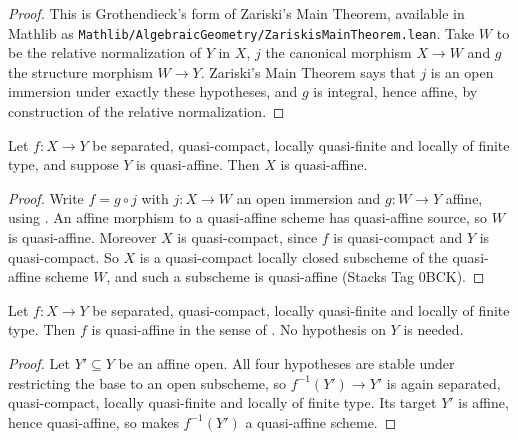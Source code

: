 \begin{proof}
  \leanok
  This is Grothendieck's form of Zariski's Main Theorem, available in Mathlib
  as \texttt{Mathlib/AlgebraicGeometry/ZariskisMainTheorem.lean}.  Take $W$ to
  be the relative normalization of $Y$ in $X$, $j$ the canonical morphism
  $X\to W$ and $g$ the structure morphism $W\to Y$.  Zariski's Main Theorem
  says that $j$ is an open immersion under exactly these hypotheses, and $g$ is
  integral, hence affine, by construction of the relative normalization.
\end{proof}

\begin{lemma}
  \label{lemma:nagata-zmt-quasi-affine-source}
  \leanok

  Let $f\colon X\to Y$ be separated, quasi-compact, locally quasi-finite and
  locally of finite type, and suppose $Y$ is quasi-affine.  Then $X$ is
  quasi-affine.
\end{lemma}

\begin{proof}
  \leanok
  Write $f=g\circ j$ with $j\colon X\to W$ an open immersion and $g\colon W\to
  Y$ affine, using
  .  An affine
  morphism to a quasi-affine scheme has quasi-affine source, so $W$ is
  quasi-affine.  Moreover $X$ is quasi-compact, since $f$ is quasi-compact and
  $Y$ is quasi-compact.  So $X$ is a quasi-compact locally closed subscheme of
  the quasi-affine scheme $W$, and such a subscheme is quasi-affine (Stacks Tag
  0BCK).
\end{proof}

\begin{lemma}
  \label{lemma:nagata-quasi-affine-morphism-of-quasi-finite}
  \leanok

  Let $f\colon X\to Y$ be separated, quasi-compact, locally quasi-finite and
  locally of finite type.  Then $f$ is quasi-affine in the sense of
  .  No hypothesis on $Y$ is needed.
\end{lemma}

\begin{proof}
  \leanok
  Let $Y'\subseteq Y$ be an affine open.  All four hypotheses are stable under
  restricting the base to an open subscheme, so $f^{-1}(Y')\to Y'$ is again
  separated, quasi-compact, locally quasi-finite and locally of finite type.
  Its target $Y'$ is affine, hence quasi-affine, so
   makes $f^{-1}(Y')$ a quasi-affine
  scheme.
\end{proof}

